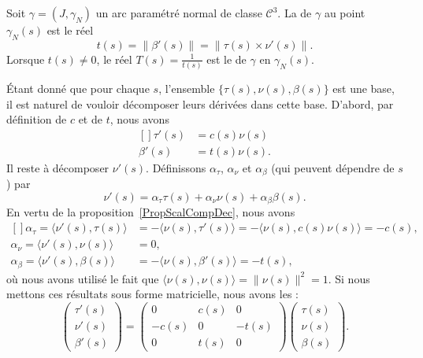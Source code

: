 \begin{definition}      \label{DefTorsion}
	Soit \( \gamma=(J,\gamma_N)\) un arc paramétré normal de classe \( \mathcal{C}^3\). La  de \( \gamma\) au point \( \gamma_N(s)\) est le réel
	\begin{equation}
		t(s)=\| \beta'(s) \|=\| \tau(s)\times\nu'(s) \|.
	\end{equation}
	Lorsque \( t(s)\neq 0\), le réel \( T(s)=\frac{1}{ t(s) }\) est le  de \( \gamma\) en \( \gamma_N(s)\).
\end{definition}

Étant donné que pour chaque \( s\), l'ensemble \( \{ \tau(s),\nu(s),\beta(s) \}\) est une base, il est naturel de vouloir décomposer leurs dérivées dans cette base. D'abord, par définition de \( c\) et de \( t\), nous avons
\begin{equation}
	\begin{aligned}[]
		\tau'(s)  & =c(s)\nu(s)  \\
		\beta'(s) & =t(s)\nu(s).
	\end{aligned}
\end{equation}
Il reste à décomposer \( \nu'(s)\). Définissons \( \alpha_{\tau}\), \( \alpha_{\nu}\) et \( \alpha_{\beta}\) (qui peuvent dépendre de \( s\)) par
\begin{equation}
	\nu'(s)=\alpha_{\tau}\tau(s)+\alpha_{\nu}\nu(s)+\alpha_{\beta}\beta(s).
\end{equation}
En vertu de la proposition~\ref{PropScalCompDec}, nous avons
\begin{equation}
	\begin{aligned}[]
		\alpha_{\tau}=\langle \nu'(s), \tau(s)\rangle   & =-\langle \nu(s), \tau'(s)\rangle =-\langle \nu(s), c(s)\nu(s)\rangle =-c(s) , \\
		\alpha_{\nu}=\langle \nu'(s),  \nu(s)\rangle    & =0,                                                                            \\
		\alpha_{\beta}=\langle \nu'(s), \beta(s)\rangle & =-\langle \nu(s), \beta'(s)\rangle =-t(s),
	\end{aligned}
\end{equation}
où nous avons utilisé le fait que \( \langle \nu(s), \nu(s)\rangle =\| \nu(s) \|^2=1\). Si nous mettons ces résultats sous forme matricielle, nous avons les  :
\begin{equation}
	\begin{pmatrix}
		\tau'(s) \\
		\nu'(s)  \\
		\beta'(s)
	\end{pmatrix}=
	\begin{pmatrix}
		0     & c(s) & 0     \\
		-c(s) & 0    & -t(s) \\
		0     & t(s) & 0
	\end{pmatrix}
	\begin{pmatrix}
		\tau(s) \\
		\nu(s)  \\
		\beta(s)
	\end{pmatrix}.
\end{equation}


